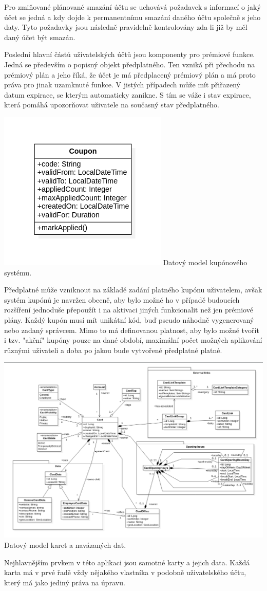\begin{itemize}
\begin{itemize}
		Pro zmiňované plánované smazání účtu se uchovává požadavek s informací o jaký účet se jedná a kdy dojde k permanentnímu
		smazání daného účtu společně s jeho daty.
		Tyto požadavky jsou následně pravidelně kontrolovány zda-li již by měl daný účet být smazán.

		Poslední hlavní částů uživatelských účtů jsou komponenty pro prémiové funkce.
		Jedná se především o popisný objekt předplatného.
		Ten vzniká při přechodu na prémiový plán a jeho říká, že účet je má předplacený prémiový plán a má proto práva pro
		jinak uzamknuté funkce.
		V jistých případech může mít přiřazený datum expirace, se kterým automaticky zanikne.
		S tím se váže i stav expirace, která pomáhá upozorňovat uživatele na současný stav předplatného.

		\includegraphics[width=0.24\linewidth]{obrazky/datovy_model_kupon}\hfill
		Datový model kupónového systému. %

		Předplatné může vzniknout na základě zadání platného kupónu uživatelem, avšak systém kupónů je navržen obecně, aby
		bylo možné ho v případě budoucích rozšíření jednoduše přepoužít i na aktivaci jiných funkcionalit než jen
		prémiové plány.
		Každý kupón musí mít unikátní kód, buď pseudo náhodně vygenerovaný nebo zadaný správcem.
		Mimo to má definovanou platnost, aby bylo možné tvořit i tzv. "akční" kupóny pouze na dané období, maximální počet
		možných aplikování různými uživateli a doba po jakou bude vytvořené předplatné platné.

		\includegraphics[width=0.24\linewidth]{obrazky/datovy_model_karta}\hfill
		Datový model karet a navázaných dat. %

		Nejhlavnějším prvkem v této aplikaci jsou samotné karty a jejich data.
		Každá karta má v prvé řadě vždy nějakého vlastníka v podobně uživatelského účtu, který má jako jediný práva na
		úpravu.


\end{itemize}
\end{itemize}
